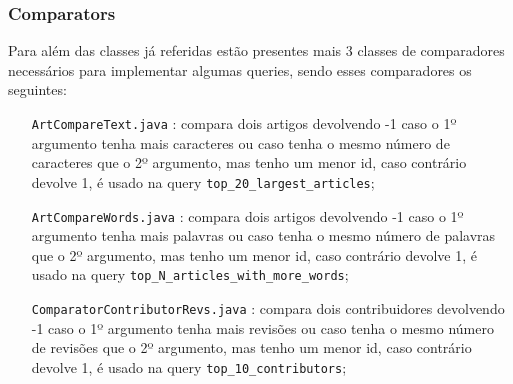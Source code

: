 \documentclass[a4paper,11pt]{article}
\begin{document}
\subsubsection{Comparators}
Para além das classes já referidas estão presentes mais 3 classes de comparadores necessários para implementar algumas queries, sendo esses comparadores os seguintes:
\begin{itemize}[align=left]
\item[\texttt{ArtCompareText.java}]: compara dois artigos devolvendo -1 caso o 1º argumento tenha mais caracteres ou caso tenha o mesmo número de caracteres que o 2º argumento, mas tenho um menor id, caso contrário devolve 1, é usado na query \texttt{top_20_largest_articles};
\item[\texttt{ArtCompareWords.java}]: compara dois artigos devolvendo -1 caso o 1º argumento tenha mais palavras ou caso tenha o mesmo número de palavras que o 2º argumento, mas tenho um menor id, caso contrário devolve 1, é usado na query \texttt{top_N_articles_with_more_words};
\item[\texttt{ComparatorContributorRevs.java}]: compara dois contribuidores devolvendo -1 caso o 1º argumento tenha mais revisões ou caso tenha o mesmo número de revisões que o 2º argumento, mas tenho um menor id, caso contrário devolve 1, é usado na query \texttt{top_10_contributors};
\end{itemize}
\end{document}
